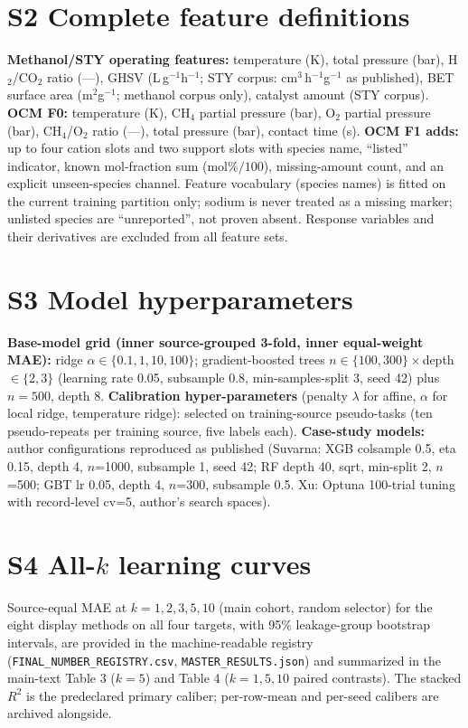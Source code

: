 \documentclass[11pt,a4paper]{article}
\begin{document}
\section{S2 Complete feature definitions}
\textbf{Methanol/STY operating features:} temperature (K), total pressure (bar),
H$_2$/CO$_2$ ratio (---), GHSV (L\,g$^{-1}$h$^{-1}$; STY corpus: cm$^3$\,h$^{-1}$g$^{-1}$
as published), BET surface area (m$^2$g$^{-1}$; methanol corpus only), catalyst amount
(STY corpus). \textbf{OCM F0:} temperature (K), CH$_4$ partial pressure (bar), O$_2$
partial pressure (bar), CH$_4$/O$_2$ ratio (---), total pressure (bar), contact time (s).
\textbf{OCM F1 adds:} up to four cation slots and two support slots with species name,
``listed'' indicator, known mol-fraction sum (mol\%$/100$), missing-amount count, and an
explicit unseen-species channel. Feature vocabulary (species names) is fitted on the
current training partition only; sodium is never treated as a missing marker; unlisted
species are ``unreported'', not proven absent. Response variables and their derivatives
are excluded from all feature sets.

\section{S3 Model hyperparameters}
\textbf{Base-model grid (inner source-grouped 3-fold, inner equal-weight MAE):} ridge
$\alpha\in\{0.1,1,10,100\}$; gradient-boosted trees $n\in\{100,300\}\times$depth
$\in\{2,3\}$ (learning rate 0.05, subsample 0.8, min-samples-split 3, seed 42) plus
$n=500$, depth 8. \textbf{Calibration hyper-parameters} (penalty $\lambda$ for affine,
$\alpha$ for local ridge, temperature ridge): selected on training-source pseudo-tasks
(ten pseudo-repeats per training source, five labels each). \textbf{Case-study models:}
author configurations reproduced as published (Suvarna: XGB colsample 0.5, eta 0.15,
depth 4, $n$=1000, subsample 1, seed 42; RF depth 40, sqrt, min-split 2, $n$=500; GBT
lr 0.05, depth 4, $n$=300, subsample 0.5. Xu: Optuna 100-trial tuning with record-level
cv=5, author's search spaces).

\section{S4 All-$k$ learning curves}
Source-equal MAE at $k=1,2,3,5,10$ (main cohort, random selector) for the eight display
methods on all four targets, with 95\% leakage-group bootstrap intervals, are provided in
the machine-readable registry (\texttt{FINAL\_NUMBER\_REGISTRY.csv},
\texttt{MASTER\_RESULTS.json}) and summarized in the main-text Table 3 ($k=5$) and
Table 4 ($k=1,5,10$ paired contrasts). The stacked $R^2$ is the predeclared primary
caliber; per-row-mean and per-seed calibers are archived alongside.
\end{document}
